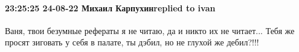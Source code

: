  
 
 
 
 

\paragraph{23:25:25 24-08-22 Михаил Карпухинreplied to ivan}

Ваня, твои безумные рефераты я не читаю, да и никто их не читает... Тебя же
просят зиговать у себя в палате, ты дэбил, но не глухой же дебил?!!!
